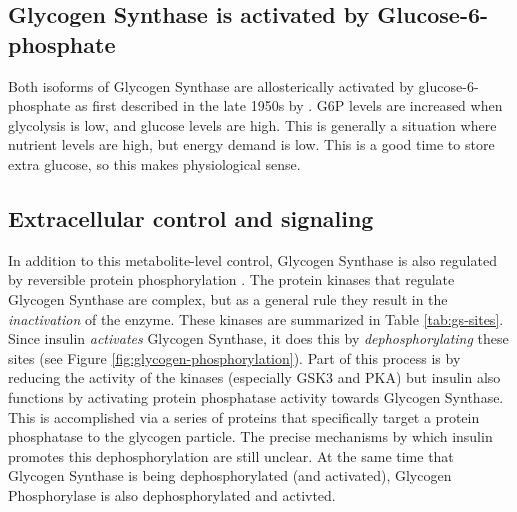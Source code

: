 \documentclass{tufte-handout}
\begin{document}
\subsection{Glycogen Synthase is activated by Glucose-6-phosphate}

Both isoforms of Glycogen Synthase are allosterically activated by glucose-6-phosphate as first described in the late 1950s by \citet{Leloir1959}.  G6P levels are increased when glycolysis is low, and glucose levels are high.  This is generally a situation where nutrient levels are high, but energy demand is low.  This is a good time to store extra glucose, so this makes physiological sense.

\subsection{Extracellular control and signaling}

In addition to this metabolite-level control, Glycogen Synthase is also regulated by reversible protein phosphorylation \citep{Larner1960}.  The protein kinases that regulate Glycogen Synthase are complex, but as a general rule they result in the \emph{inactivation} of the enzyme.  These kinases are summarized in Table \ref{tab:gs-sites}.  Since insulin \emph{activates} Glycogen Synthase, it does this by \emph{dephosphorylating} these sites (see Figure \ref{fig:glycogen-phosphorylation}).  Part of this process is by reducing the activity of the kinases (especially GSK3 and PKA) but insulin also functions by activating protein phosphatase activity towards Glycogen Synthase.  This is accomplished via a series of proteins that specifically target a protein phosphatase to the glycogen particle.  The precise mechanisms by which insulin promotes this dephosphorylation are still unclear.  At the same time that Glycogen Synthase is being dephosphorylated (and activated), Glycogen Phosphorylase is also dephosphorylated and activted.
\end{document}
